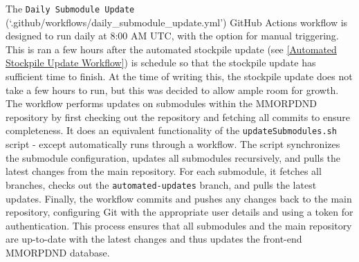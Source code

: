 The \texttt{Daily Submodule Update} (`.github/workflows/daily\_submodule\_update.yml') GitHub Actions workflow is designed to run daily at 8:00 AM UTC, with the option for manual triggering. This is ran a few hours after the automated stockpile update (see \ref{Automated Stockpile Update Workflow}) is schedule so that the stockpile update has sufficient time to finish. At the time of writing this, the stockpile update does not take a few hours to run, but this was decided to allow ample room for growth. The workflow performs updates on submodules within the MMORPDND repository by first checking out the repository and fetching all commits to ensure completeness. It does an equivalent functionality of the \texttt{updateSubmodules.sh} script - except automatically runs through a workflow. The script synchronizes the submodule configuration, updates all submodules recursively, and pulls the latest changes from the main repository. For each submodule, it fetches all branches, checks out the \texttt{automated-updates} branch, and pulls the latest updates. Finally, the workflow commits and pushes any changes back to the main repository, configuring Git with the appropriate user details and using a token for authentication. This process ensures that all submodules and the main repository are up-to-date with the latest changes and thus updates the front-end MMORPDND database.




